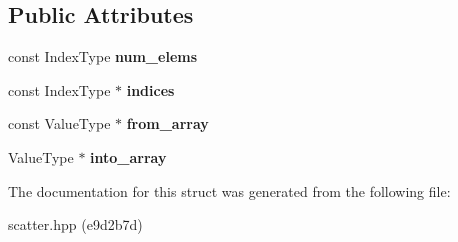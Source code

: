 \subsection*{Public Attributes}
\begin{DoxyCompactItemize}
\item 
\mbox{\label{structschwz_1_1Scatter_a43252cdb86c252b755384ce913530016}} 
const Index\+Type {\bfseries num\+\_\+elems}
\item 
\mbox{\label{structschwz_1_1Scatter_ace6df48951fb83fde6e7a69779253d8b}} 
const Index\+Type $\ast$ {\bfseries indices}
\item 
\mbox{\label{structschwz_1_1Scatter_ad956399c31d1c016f97802de1b844440}} 
const Value\+Type $\ast$ {\bfseries from\+\_\+array}
\item 
\mbox{\label{structschwz_1_1Scatter_af0f17b144ec184891ad4f3411f6d83cc}} 
Value\+Type $\ast$ {\bfseries into\+\_\+array}
\end{DoxyCompactItemize}


The documentation for this struct was generated from the following file\+:\begin{DoxyCompactItemize}
\item 
scatter.\+hpp (e9d2b7d)\end{DoxyCompactItemize}
